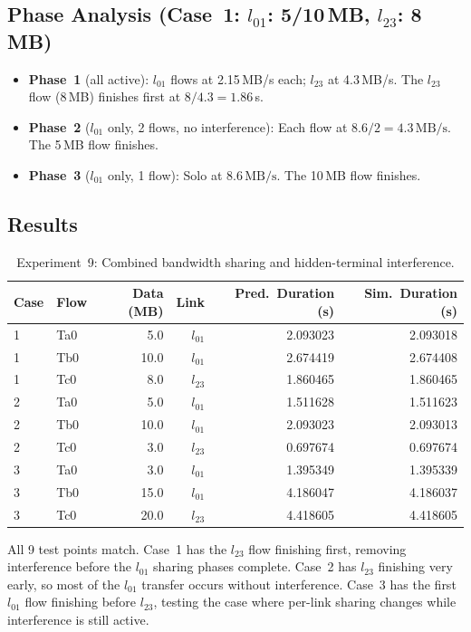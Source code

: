 \documentclass[11pt,a4paper]{article}
\newcommand{\MBs}{\,\text{MB/s}}
\begin{document}
\subsection{Phase Analysis (Case~1: $l_{01}$: 5/10\,MB, $l_{23}$: 8\,MB)}
\begin{itemize}    \item \textbf{Phase~1} (all active): $l_{01}$ flows at 2.15\,MB/s each; $l_{23}$ at 4.3\,MB/s. The $l_{23}$ flow (8\,MB) finishes first at $8/4.3 = 1.86\,$s.
    \item \textbf{Phase~2} ($l_{01}$ only, 2 flows, no interference): Each flow at $8.6/2 = 4.3\MBs$. The 5\,MB flow finishes.
    \item \textbf{Phase~3} ($l_{01}$ only, 1 flow): Solo at $8.6\MBs$. The 10\,MB flow finishes.
\end{itemize}

\subsection{Results}

\begin{table}[h]
\centering
\caption{Experiment~9: Combined bandwidth sharing and hidden-terminal interference.}
\label{tab:exp9}
\begin{tabular}{llrrrr}
\toprule
Case & Flow & Data (MB) & Link & Pred.\ Duration (s) & Sim.\ Duration (s) \\
\midrule
1 & Ta0 &  5.0 & $l_{01}$ & 2.093023 & 2.093018 \\
1 & Tb0 & 10.0 & $l_{01}$ & 2.674419 & 2.674408 \\
1 & Tc0 &  8.0 & $l_{23}$ & 1.860465 & 1.860465 \\
\midrule
2 & Ta0 &  5.0 & $l_{01}$ & 1.511628 & 1.511623 \\
2 & Tb0 & 10.0 & $l_{01}$ & 2.093023 & 2.093013 \\
2 & Tc0 &  3.0 & $l_{23}$ & 0.697674 & 0.697674 \\
\midrule
3 & Ta0 &  3.0 & $l_{01}$ & 1.395349 & 1.395339 \\
3 & Tb0 & 15.0 & $l_{01}$ & 4.186047 & 4.186037 \\
3 & Tc0 & 20.0 & $l_{23}$ & 4.418605 & 4.418605 \\
\bottomrule
\end{tabular}
\end{table}

All 9 test points match. Case~1 has the $l_{23}$ flow finishing first, removing interference before the $l_{01}$ sharing phases complete. Case~2 has $l_{23}$ finishing very early, so most of the $l_{01}$ transfer occurs without interference. Case~3 has the first $l_{01}$ flow finishing before $l_{23}$, testing the case where per-link sharing changes while interference is still active.
\end{document}
